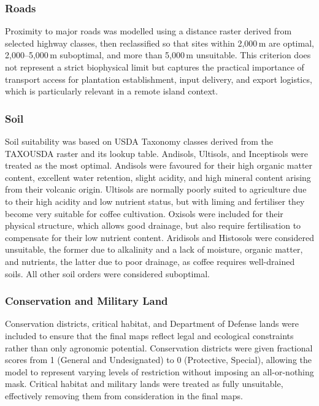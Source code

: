 \documentclass[12pt,a4paper]{article}
\begin{document}
\subsubsection{Roads}

Proximity to major roads was modelled using a distance raster derived from selected highway classes, then reclassified so that sites within 2{,}000\,m are optimal, 2{,}000--5{,}000\,m suboptimal, and more than 5{,}000\,m unsuitable. This criterion does not represent a strict biophysical limit but captures the practical importance of transport access for plantation establishment, input delivery, and export logistics, which is particularly relevant in a remote island context.

\subsubsection{Soil}

Soil suitability was based on USDA Taxonomy classes derived from the TAXOUSDA raster and its lookup table. Andisols, Ultisols, and Inceptisols were treated as the most optimal. Andisols were favoured for their high organic matter content, excellent water retention, slight acidity, and high mineral content arising from their volcanic origin. Ultisols are normally poorly suited to agriculture due to their high acidity and low nutrient status, but with liming and fertiliser they become very suitable for coffee cultivation. Oxisols were included for their physical structure, which allows good drainage, but also require fertilisation to compensate for their low nutrient content. Aridisols and Histosols were considered unsuitable, the former due to alkalinity and a lack of moisture, organic matter, and nutrients, the latter due to poor drainage, as coffee requires well-drained soils. All other soil orders were considered suboptimal.

\subsubsection{Conservation and Military Land}
\label{sec:conservation}

Conservation districts, critical habitat, and Department of Defense lands were included to ensure that the final maps reflect legal and ecological constraints rather than only agronomic potential. Conservation districts were given fractional scores from 1 (General and Undesignated) to 0 (Protective, Special), allowing the model to represent varying levels of restriction without imposing an all-or-nothing mask. Critical habitat and military lands were treated as fully unsuitable, effectively removing them from consideration in the final maps.
\end{document}

